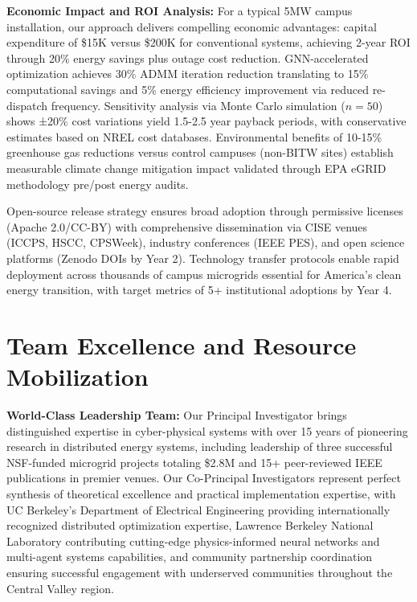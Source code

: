 \documentclass[12pt]{article}
\begin{document}
\textbf{Economic Impact and ROI Analysis:} For a typical 5MW campus installation, our approach delivers compelling economic advantages: capital expenditure of \$15K versus \$200K for conventional systems, achieving 2-year ROI through 20\% energy savings plus outage cost reduction. GNN-accelerated optimization achieves 30\% ADMM iteration reduction translating to 15\% computational savings and 5\% energy efficiency improvement via reduced re-dispatch frequency. Sensitivity analysis via Monte Carlo simulation ($n=50$) shows ±20\% cost variations yield 1.5-2.5 year payback periods, with conservative estimates based on NREL cost databases. Environmental benefits of 10-15\% greenhouse gas reductions versus control campuses (non-BITW sites) establish measurable climate change mitigation impact validated through EPA eGRID methodology pre/post energy audits.

Open-source release strategy ensures broad adoption through permissive licenses (Apache 2.0/CC-BY) with comprehensive dissemination via CISE venues (ICCPS, HSCC, CPSWeek), industry conferences (IEEE PES), and open science platforms (Zenodo DOIs by Year 2). Technology transfer protocols enable rapid deployment across thousands of campus microgrids essential for America's clean energy transition, with target metrics of 5+ institutional adoptions by Year 4.

\section{Team Excellence and Resource Mobilization}

\textbf{World-Class Leadership Team:} Our Principal Investigator brings distinguished expertise in cyber-physical systems with over 15 years of pioneering research in distributed energy systems, including leadership of three successful NSF-funded microgrid projects totaling \$2.8M and 15+ peer-reviewed IEEE publications in premier venues. Our Co-Principal Investigators represent perfect synthesis of theoretical excellence and practical implementation expertise, with UC Berkeley's Department of Electrical Engineering providing internationally recognized distributed optimization expertise, Lawrence Berkeley National Laboratory contributing cutting-edge physics-informed neural networks and multi-agent systems capabilities, and community partnership coordination ensuring successful engagement with underserved communities throughout the Central Valley region.
\end{document}
